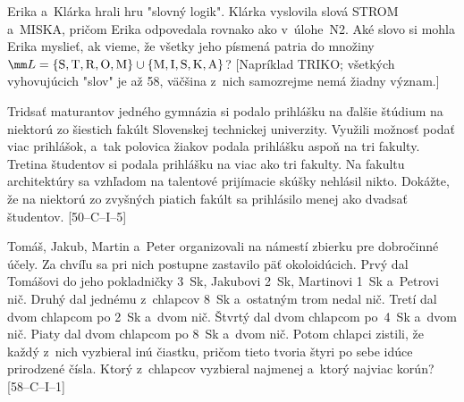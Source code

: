 {Erika a~Klárka hrali hru "slovný logik". Klárka vyslovila slová
STROM a~MISKA, pričom Erika odpovedala rovnako ako v~úlohe~N2. Aké slovo si mohla Erika myslieť, ak vieme,
že všetky jeho písmená patria do množiny $\mm L=\rm\{S,T,R,O,M\}\cup\{M,I,S,K,A\}$?
[Napríklad TRIKO; všetkých vyhovujúcich "slov" je až 58, väčšina z~nich samozrejme nemá žiadny význam.]

\D
Tridsať maturantov jedného gymnázia si podalo prihlášku na ďalšie
štúdium na niektorú zo šiestich fakúlt Slovenskej technickej univerzity.
Využili možnosť podať viac prihlášok, a~tak polovica
žiakov podala prihlášku aspoň na tri fakulty. Tretina študentov
si podala prihlášku na viac ako tri fakulty. Na fakultu architektúry sa
vzhľadom na talentové prijímacie skúšky nehlásil nikto. Dokážte,
že na niektorú zo zvyšných piatich fakúlt sa prihlásilo menej ako
dvadsať študentov. [50--C--I--5]

Tomáš, Jakub, Martin a~Peter organizovali na námestí zbierku pre dobročinné účely.
Za chvíľu sa pri nich postupne zastavilo päť okoloidúcich. Prvý dal Tomášovi
do jeho pokladničky 3~Sk, Jakubovi 2~Sk, Martinovi 1~Sk a~Petrovi nič. Druhý
dal jednému z~chlapcov 8~Sk a~ostatným trom nedal nič.
Tretí dal dvom chlapcom po 2~Sk a~dvom nič. Štvrtý dal dvom chlapcom
po~4~Sk a~dvom nič. Piaty dal dvom chlapcom po 8~Sk a~dvom nič.
Potom chlapci zistili, že každý z~nich vyzbieral inú čiastku,
pričom tieto tvoria štyri po sebe idúce prirodzené čísla.
Ktorý z~chlapcov vyzbieral najmenej a~ktorý najviac korún? [58--C--I--1]
}

